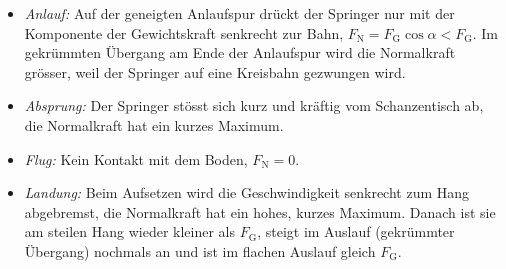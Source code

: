 \begin{center}
\end{center}

\begin{itemize}
\item \emph{Anlauf:} Auf der geneigten Anlaufspur drückt der Springer nur mit der Komponente der Gewichtskraft senkrecht zur Bahn, $F_\text{N} = F_\text{G}\cos\alpha < F_\text{G}$. Im gekrümmten Übergang am Ende der Anlaufspur wird die Normalkraft grösser, weil der Springer auf eine Kreisbahn gezwungen wird.
\item \emph{Absprung:} Der Springer stösst sich kurz und kräftig vom Schanzentisch ab, die Normalkraft hat ein kurzes Maximum.
\item \emph{Flug:} Kein Kontakt mit dem Boden, $F_\text{N} = 0$.
\item \emph{Landung:} Beim Aufsetzen wird die Geschwindigkeit senkrecht zum Hang abgebremst, die Normalkraft hat ein hohes, kurzes Maximum. Danach ist sie am steilen Hang wieder kleiner als $F_\text{G}$, steigt im Auslauf (gekrümmter Übergang) nochmals an und ist im flachen Auslauf gleich $F_\text{G}$.
\end{itemize}
